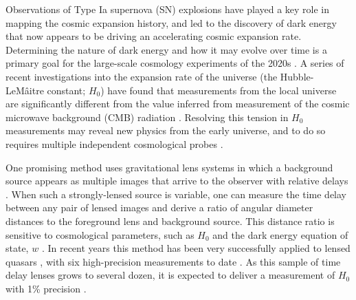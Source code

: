 \documentclass[12pt,dvipsnames]{article}
\begin{document}




Observations of Type Ia supernova (SN) explosions have played a key role in mapping the cosmic expansion history, and led to the discovery of dark energy that now appears to be driving an accelerating cosmic expansion rate\cite{riess_observational_1998,perlmutter_measurements_1999, Riess_large_2019}.  Determining the nature of dark energy and how it may evolve over time is a primary goal for the large-scale cosmology experiments of the 2020s \cite{amendola_cosmology_2013,spergel_wide_2015,Ivezic_lsst_2019}.
A series of recent investigations into the expansion rate of the universe (the Hubble-LeM\^aitre constant; $H_0$) have found that measurements from the local universe are significantly different from the value inferred from measurement of the cosmic microwave background (CMB) radiation \cite{Riess_large_2019,aghanim_planck_2018}.  Resolving this tension in $H_0$ measurements may reveal new physics from the early universe, and to do so requires multiple 
independent cosmological probes \cite{verde_tensions_2019}.

One promising method uses %
gravitational lens systems in which a background
source appears as multiple images that arrive to the observer with relative delays \cite{einstein_lens_1936}.
When such a strongly-lensed source is variable, one can measure the time delay between any pair of lensed images and derive a ratio of angular diameter distances to the foreground lens and background source. 
This distance ratio is sensitive to cosmological parameters, such as 
$H_0$  and the dark energy equation of state, $w$ \cite{refsdal_possibility_1964,coe_cosmological_2009,linder_lensing_2011}.
In recent years this method has been very successfully applied to lensed
quasars \cite{suyu_cosmology_2014,bonvin_cosmograil_2019}, with six high-precision measurements to date \cite{wong_h0licow_2019}. As this sample of time delay lenses grows to several dozen, it is expected to deliver a measurement of $H_0$ with 1\% precision \cite{suyu_cosmological_2018}.  
\end{document}
